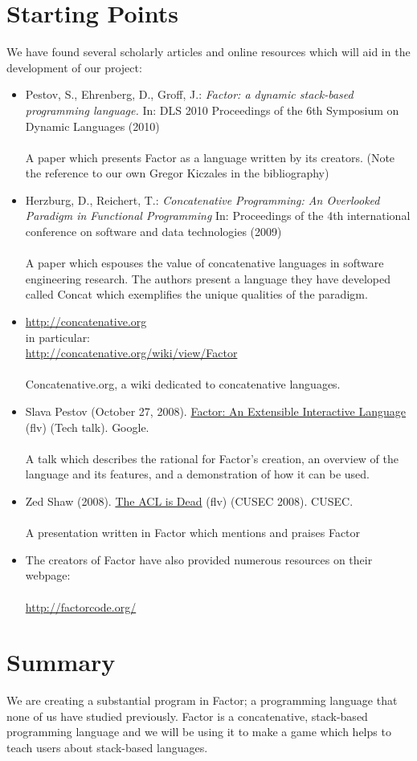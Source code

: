 \documentclass{sig-alternate}
\begin{document}
\section{Starting Points}
We have found several scholarly articles and online resources
which will aid in the development of our project:

\begin{itemize}
\item Pestov, S., Ehrenberg, D., Groff, J.: \textit{Factor: a dynamic stack-based programming
language.} In: DLS 2010 Proceedings of the 6th Symposium on Dynamic Languages
(2010)\\\\A paper which presents Factor as a language written by its creators. (Note the
reference to our own Gregor Kiczales in the bibliography)
\item Herzburg, D., Reichert, T.: \textit{Concatenative Programming:
An Overlooked Paradigm in Functional Programming} In: Proceedings of the 4th
international conference on software and data technologies (2009)
\\\\A paper which espouses the value of concatenative languages in software engineering 
research. The authors present a language they have developed called Concat which exemplifies the unique qualities of the paradigm.
\item \url{http://concatenative.org}\\
in particular:\\\url{http://concatenative.org/wiki/view/Factor}\\\\Concatenative.org, a wiki dedicated to concatenative languages.
\item Slava Pestov (October 27, 2008). \href{http://youtu.be/f_0QlhYlS8g}{Factor: An Extensible Interactive Language} (flv) (Tech talk). Google.\\\\A talk which describes the rational for Factor's creation, an overview of the language and its features, and a demonstration of how it can be used.
\item Zed Shaw (2008). \href{http://vimeo.com/2723800}{The ACL is Dead} (flv) (CUSEC 2008). CUSEC.\\\\
A presentation written in Factor which mentions and praises Factor
\item The creators of Factor have also provided numerous resources on their webpage:\\\\\url{http://factorcode.org/}
\end{itemize}


\section{Summary}
We are creating a substantial program in Factor; a programming language that none of us have studied previously. Factor is a concatenative, stack-based programming language and we will be using it to make a game which helps to teach users about stack-based languages.


\balancecolumns
\end{document}
